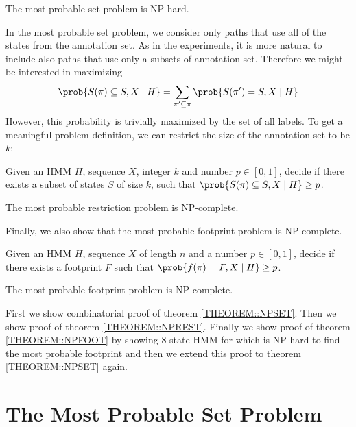 \begin{theorem}
The most probable set problem is NP-hard. \label{THEOREM::NPSET}
\end{theorem}

In the most probable set problem, we consider only paths that use all
of the states from the annotation set. As in the experiments, it is more natural to 
include also paths that use only a subsets of annotation set. Therefore we
might be interested in maximizing 
\[
\prob{S(\pi) \subseteq S, X\mid H} = \sum_{\pi'\subseteq\pi}\prob{S(\pi') = S, X\mid H}
\]
However, this probability is trivially maximized by the set of all labels. To
get a meaningful problem definition, we can restrict the size of the annotation
set to be $k$:

\begin{definition}
Given an HMM $H$, sequence $X$, integer $k$ and number $p\in[0,1]$, decide if
there exists a subset of states $S$ of size $k$, such that
$\prob{S(\pi)\subseteq S, X\mid H} \geq p$.
\end{definition}

\begin{theorem}
The most probable restriction problem is NP-complete. \label{THEOREM::NPREST}
\end{theorem}

Finally, we also show that the most probable footprint problem is NP-complete.
\begin{definition}
Given an HMM $H$, sequence $X$
of length $n$ and a number $p\in [0,1]$, decide if there exists a footprint $F$
such that $\prob{f(\pi) = F, X\mid H}\geq p$.
\end{definition}

\begin{theorem}
The most probable footprint problem is NP-complete.
\label{THEOREM::NPFOOT}
\end{theorem}
First we show combinatorial proof of theorem \ref{THEOREM::NPSET}. Then we
show proof of theorem \ref{THEOREM::NPREST}. Finally we show proof of theorem
\ref{THEOREM::NPFOOT} by showing $8$-state HMM for which is NP hard to find the
most probable footprint and then we extend this proof to theorem
\ref{THEOREM::NPSET} again. 

\section{The Most Probable Set Problem}
\label{sec:set}

